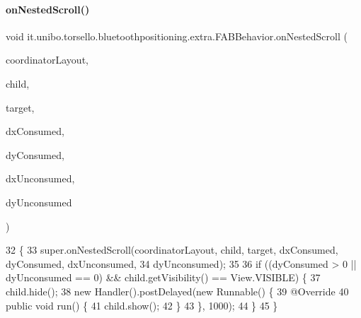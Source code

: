 \paragraph{\texorpdfstring{on\+Nested\+Scroll()}{onNestedScroll()}}
{\footnotesize\ttfamily void it.\+unibo.\+torsello.\+bluetoothpositioning.\+extra.\+F\+A\+B\+Behavior.\+on\+Nested\+Scroll (\begin{DoxyParamCaption}\item[{Coordinator\+Layout}]{coordinator\+Layout,  }\item[{final Floating\+Action\+Button}]{child,  }\item[{View}]{target,  }\item[{int}]{dx\+Consumed,  }\item[{int}]{dy\+Consumed,  }\item[{int}]{dx\+Unconsumed,  }\item[{int}]{dy\+Unconsumed }\end{DoxyParamCaption})}


\begin{DoxyCode}
32                                                                                                            
           \{
33         super.onNestedScroll(coordinatorLayout, child, target, dxConsumed, dyConsumed, dxUnconsumed,
34                 dyUnconsumed);
35 
36         \textcolor{keywordflow}{if} ((dyConsumed > 0 || dyUnconsumed == 0) && child.getVisibility() == View.VISIBLE) \{
37             child.hide();
38             \textcolor{keyword}{new} Handler().postDelayed(\textcolor{keyword}{new} Runnable() \{
39                 @Override
40                 \textcolor{keyword}{public} \textcolor{keywordtype}{void} run() \{
41                     child.show();
42                 \}
43             \}, 1000);
44         \}
45     \}
\end{DoxyCode}
\hypertarget{classit_1_1unibo_1_1torsello_1_1bluetoothpositioning_1_1extra_1_1FABBehavior_a5c6501a08ec79dd6bd92106b72c14979_a5c6501a08ec79dd6bd92106b72c14979}{}\label{classit_1_1unibo_1_1torsello_1_1bluetoothpositioning_1_1extra_1_1FABBehavior_a5c6501a08ec79dd6bd92106b72c14979_a5c6501a08ec79dd6bd92106b72c14979} 
